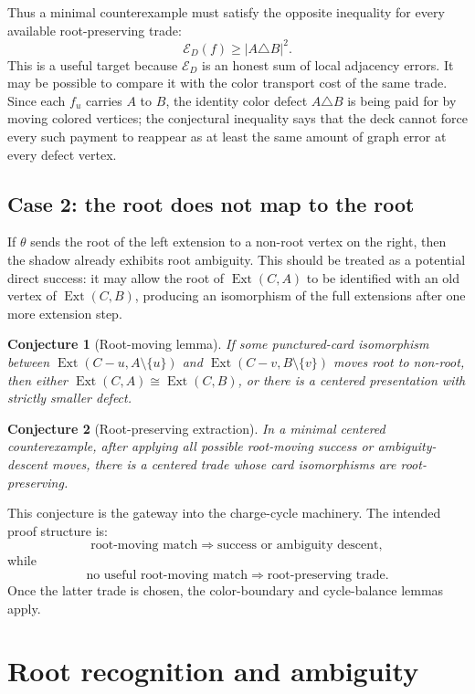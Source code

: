 \documentclass[11pt]{article}
\newtheorem{conjecture}{Conjecture}
\newcommand{\Ext}{\operatorname{Ext}}
\begin{document}
Thus a minimal counterexample must satisfy the opposite inequality for every
available root-preserving trade:
\[
  \mathcal E_D(f) \geq |A\triangle B|^2.
\]
This is a useful target because \(\mathcal E_D\) is an honest sum of local
adjacency errors.  It may be possible to compare it with the color transport
cost of the same trade.  Since each \(f_u\) carries \(A\) to \(B\), the
identity color defect \(A\triangle B\) is being paid for by moving colored
vertices; the conjectural inequality says that the deck cannot force every
such payment to reappear as at least the same amount of graph error at every
defect vertex.

\subsection{Case 2: the root does not map to the root}

If \(\theta\) sends the root of the left extension to a non-root vertex on the
right, then the shadow already exhibits root ambiguity.  This should be
treated as a potential direct success: it may allow the root of
\(\Ext(C,A)\) to be identified with an old vertex of \(\Ext(C,B)\), producing
an isomorphism of the full extensions after one more extension step.

\begin{conjecture}[Root-moving lemma]
If some punctured-card isomorphism between
\(\Ext(C-u,A\setminus\{u\})\) and
\(\Ext(C-v,B\setminus\{v\})\) moves root to non-root, then either
\(\Ext(C,A) \cong \Ext(C,B)\), or there is a centered presentation with
strictly smaller defect.
\end{conjecture}

\begin{conjecture}[Root-preserving extraction]
In a minimal centered counterexample, after applying all possible root-moving
success or ambiguity-descent moves, there is a centered trade whose card
isomorphisms are root-preserving.
\end{conjecture}

This conjecture is the gateway into the charge-cycle machinery.  The intended
proof structure is:
\[
  \text{root-moving match}
  \Rightarrow
  \text{success or ambiguity descent},
\]
while
\[
  \text{no useful root-moving match}
  \Rightarrow
  \text{root-preserving trade}.
\]
Once the latter trade is chosen, the color-boundary and cycle-balance lemmas
apply.

\section{Root recognition and ambiguity}
\end{document}
